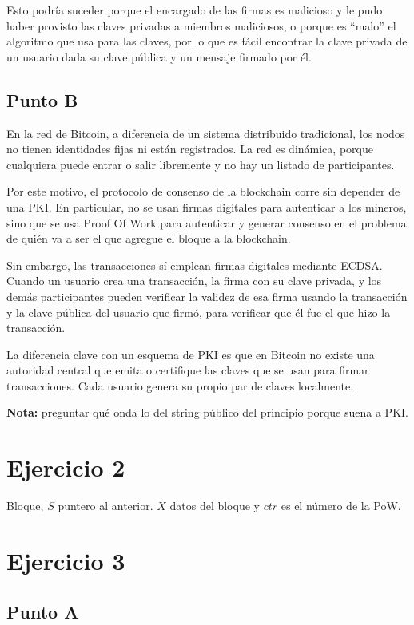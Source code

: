 \documentclass[12pt]{article}
\begin{document}
Esto podría suceder porque el encargado de las firmas es malicioso y le pudo haber provisto las claves privadas a miembros maliciosos, o porque es ``malo'' el algoritmo que usa para las claves, por lo que es fácil encontrar la clave privada de un usuario dada su clave pública y un mensaje firmado por él.  

\subsection*{Punto B}

En la red de Bitcoin, a diferencia de un sistema distribuido tradicional, los nodos no tienen identidades fijas ni están registrados. La red es dinámica, porque cualquiera puede entrar o salir libremente y no hay un listado de participantes.  

Por este motivo, el protocolo de consenso de la blockchain corre sin depender de una PKI. En particular, no se usan firmas digitales para autenticar a los mineros, sino que se usa Proof Of Work para autenticar y generar consenso en el problema de quién va a ser el que agregue el bloque a la blockchain.  

Sin embargo, las transacciones sí emplean firmas digitales mediante ECDSA. Cuando un usuario crea una transacción, la firma con su clave privada, y los demás participantes pueden verificar la validez de esa firma usando la transacción y la clave pública del usuario que firmó, para verificar que él fue el que hizo la transacción.  

La diferencia clave con un esquema de PKI es que en Bitcoin no existe una autoridad central que emita o certifique las claves que se usan para firmar transacciones. Cada usuario genera su propio par de claves localmente.  

\textbf{Nota:} preguntar qué onda lo del string público del principio porque suena a PKI.  

\section*{Ejercicio 2}

Bloque, $S$ puntero al anterior. $X$ datos del bloque y $ctr$ es el número de la PoW.  

\section*{Ejercicio 3}

\subsection*{Punto A}
\end{document}

